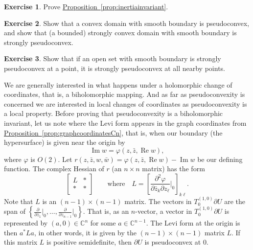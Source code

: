 \documentclass[12pt,openany]{book}
\renewcommand{\Re}{\operatorname{Re}}
\renewcommand{\Im}{\operatorname{Im}}
\newcommand{\C}{{\mathbb{C}}}
\theoremstyle{plain}
\theoremstyle{remark}
\theoremstyle{definition}
\newenvironment{exbox}{%
    \def\FrameCommand{\vrule width 1pt \relax\hspace{10pt}}%
    \MakeFramed{\advance\hsize-\width\FrameRestore}%
}{%
    \endMakeFramed
}
\theoremstyle{exercise}
\newtheorem{exercise}{Exercise}[section]
\theoremstyle{example}
\newcommand{\propref}[1]{\hyperref[#1]{Proposition~\ref*{#1}}}
\begin{document}
\begin{exbox}
\begin{exercise}
Prove \propref{prop:inertiainvariant}.
\end{exercise}

\begin{exercise}
Show that a convex domain with smooth boundary
is pseudoconvex, and show that (a bounded) strongly convex
domain with smooth boundary is strongly pseudoconvex.
\end{exercise}

\begin{exercise}
Show that if an open set with smooth boundary is strongly pseudoconvex at a point, it is strongly
pseudoconvex at all nearby points.
\end{exercise}
\end{exbox}

We are generally interested in what happens under a holomorphic change of
coordinates, that is, a biholomorphic mapping.  And as far as pseudoconvexity
is concerned we are interested in local changes of coordinates as
pseudoconvexity is a local property.  Before proving
that pseudoconvexity is a biholomorphic invariant, let us note where the
Levi form appears in the graph coordinates from
\propref{prop:graphcoordinatesCn}, that is, when our boundary (the
hypersurface) is given near the origin by
\begin{equation*}
\Im w = \varphi(z,\bar{z},\Re w) ,
\end{equation*}
where $\varphi$ is $O(2)$.
Let $r(z,\bar{z},w,\bar{w}) = \varphi(z,\bar{z},\Re w) - \Im w$ be our
defining function.  The complex Hessian of $r$ (an $n \times n$ matrix) has the form
\begin{equation*}
\begin{bmatrix}
L & * \\
* & *
\end{bmatrix}
\qquad \text{where} \quad
L = \left[
\frac{\partial^2 \varphi}{\partial \bar{z}_k \partial z_{\ell}}\Big|_0
\right]_{k \ell} .
\end{equation*}
Note that $L$ is an $(n-1) \times (n-1)$ matrix.
The vectors in $T_0^{(1,0)} \partial U$ are the span
of $\left\{
\frac{\partial}{\partial z_1}\big|_0,
\ldots,
\frac{\partial}{\partial z_{n-1}}\big|_0 \right\}$.
That is, as an $n$-vector,
a vector in $T_0^{(1,0)} \partial U$ is represented by $(a,0) \in \C^n$ for
some
$a \in \C^{n-1}$.  The Levi form at the origin is then $a^* L a$,
in other words, it is given by the $(n-1) \times (n-1)$ matrix $L$.
If this matrix $L$ is positive
semidefinite, then $\partial U$ is pseudoconvex at $0$.
\end{document}
